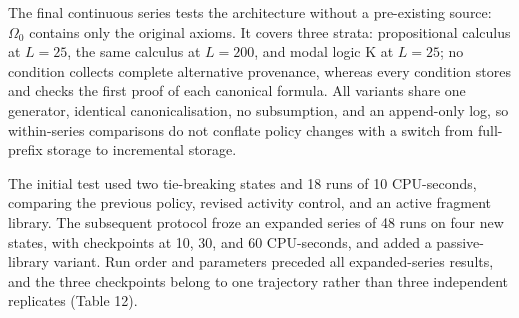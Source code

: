 \documentclass[pdflatex,sn-basic,Numbered]{sn-jnl}
\begin{document}
The final continuous series tests the architecture without a pre-existing source: \(\Omega_{0}\) contains only the original axioms. It covers three strata: propositional calculus at \(L = 25\), the same calculus at \(L = 200\), and modal logic K at \(L = 25\); no condition collects complete alternative provenance, whereas every condition stores and checks the first proof of each canonical formula. All variants share one generator, identical canonicalisation, no subsumption, and an append-only log, so within-series comparisons do not conflate policy changes with a switch from full-prefix storage to incremental storage.

The initial test used two tie-breaking states and 18 runs of 10 CPU-seconds, comparing the previous policy, revised activity control, and an active fragment library. The subsequent protocol froze an expanded series of 48 runs on four new states, with checkpoints at 10, 30, and 60 CPU-seconds, and added a passive-library variant. Run order and parameters preceded all expanded-series results, and the three checkpoints belong to one trajectory rather than three independent replicates (Table 12).

\begingroup
\small
\setlength{\tabcolsep}{3pt}
\renewcommand{\arraystretch}{1.13}
\end{document}
